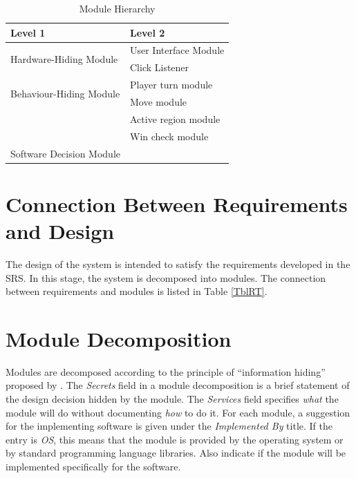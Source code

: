 \documentclass[12pt, titlepage]{article}
\begin{document}
\begin{table}[hp]
\centering
\begin{tabular}{p{} p{}}
\toprule
\textbf{Level 1} & \textbf{Level 2}\\
\midrule

\multirow{2}{0.3\textwidth}{Hardware-Hiding Module} & User Interface Module \\
& Click Listener \\
\midrule

\multirow{2}{0.3\textwidth}{Behaviour-Hiding Module} & Player turn module\\
& Move module\\
& Active region module\\
& Win check module\\
\midrule

\multirow{1}{0.3\textwidth}{Software Decision Module} & {}\\
\bottomrule

\end{tabular}
\caption{Module Hierarchy}
\label{TblMH}
\end{table}


\section{Connection Between Requirements and Design} \label{SecConnection}
The design of the system is intended to satisfy the requirements developed in
the SRS. In this stage, the system is decomposed into modules. The connection
between requirements and modules is listed in Table \ref{TblRT}.

\section{Module Decomposition} \label{SecMD}

Modules are decomposed according to the principle of ``information hiding''
proposed by \citet{ParnasEtAl1984}. The \emph{Secrets} field in a module
decomposition is a brief statement of the design decision hidden by the
module. The \emph{Services} field specifies \emph{what} the module will do
without documenting \emph{how} to do it. For each module, a suggestion for the
implementing software is given under the \emph{Implemented By} title. If the
entry is \emph{OS}, this means that the module is provided by the operating
system or by standard programming language libraries.  Also indicate if the
module will be implemented specifically for the software.
\end{document}
